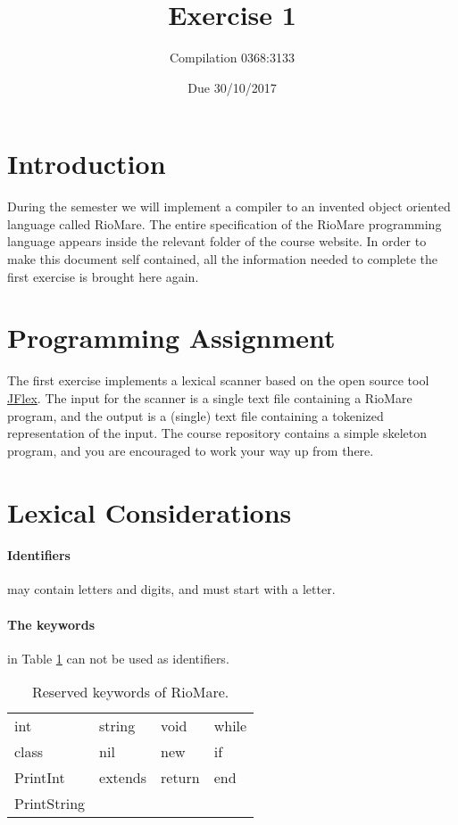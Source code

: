 \documentclass{article}
\begin{document}
\title{Exercise 1}
\author{Compilation 0368:3133}
\date{Due 30/10/2017}
\maketitle

\section{Introduction}
During the semester we will implement a compiler to an invented
object oriented language called RioMare.
The entire specification of the RioMare programming language
appears inside the relevant folder of the course website.
In order to make this document self contained,
all the information needed to complete the first exercise is brought here again.

\section{Programming Assignment}
The first exercise implements a lexical scanner based on the
open source tool \href{http://jflex.de/}{JFlex}.
The input for the scanner is a single text file containing a RioMare program,
and the output is a (single) text file containing a tokenized representation of the input.
The course repository contains a simple skeleton program,
and you are encouraged to work your way up from there.

\section{Lexical Considerations}
\paragraph{Identifiers} may contain letters and digits, and must start with a letter.
\paragraph{The keywords} in Table \ref{Table_Reserved_Keywords_of_RioMare} can not
be used as identifiers.
\begin{table}[h]
\centering
\begin{tabular}{ l l l l}
  int         & string  & void   & while \\
  class       & nil     & new    & if    \\
  PrintInt    & extends & return & end   \\
  PrintString &         &        &       \\
\end{tabular}
\caption{
Reserved keywords of RioMare.
\label{Table_Reserved_Keywords_of_RioMare}}
\end{table}
\end{document}
